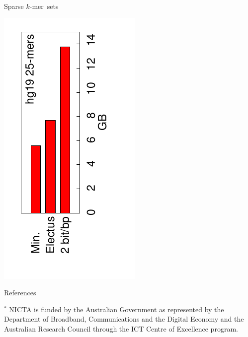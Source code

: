 \documentclass[a0paper,portrait]{baposter}
\newcommand{\kmer}{$k$-mer\ }
\begin{document}
\begin{poster}
\begin{posterbox}[name=kmers,column=2,below=usage]{Sparse \kmer sets}
\begin{center}
\includegraphics[angle=-90,scale=0.65]{hg19size}
\end{center}
\vspace{-2.5em}
\end{posterbox}

\begin{posterbox}[name=refs,column=2,row=0.725]{References}
\vspace{0.5em}
\begin{spacing}{0.1}
\footnotesize
\renewcommand{\refname}{\vspace{-0.8em}}

$^{*}$ NICTA is funded by the Australian Government as represented by the Department of Broadband, Communications and the Digital Economy and the Australian Research Council through the ICT Centre of Excellence program.
\end{spacing}
\end{posterbox}

\end{poster}
\end{document}
